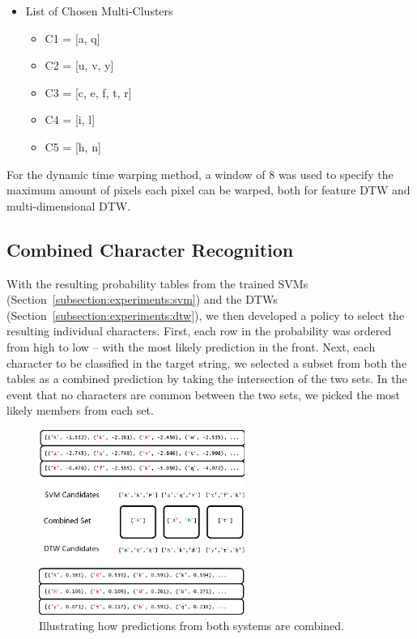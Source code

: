 \documentclass[12pt]{article}
\begin{document}
	\begin{itemize}
		\item List of Chosen Multi-Clusters
		\begin {itemize}
			\item C1 = [a, q]
			\item C2 = [u, v, y]
			\item C3 = [c, e, f, t, r]
			\item C4 = [i, l]
			\item C5 = [h, n]
		\end {itemize}
	\end {itemize}
	
	For the dynamic time warping method, a window of 8 was used to specify the maximum amount of pixels each pixel can be warped, both for feature DTW and multi-dimensional DTW.
	

	\subsection{Combined Character Recognition}
	\label{subsection:experiments:combinedchar}
		
	With the resulting probability tables from the trained SVMs (Section~\ref{subsection:experiments:svm}) and the DTWs (Section~\ref{subsection:experiments:dtw}), we then developed a policy to select the resulting individual characters. First, each row in the probability was ordered from high to low -- with the most likely prediction in the front. Next, each character to be classified in the target string, we selected a subset from both the tables as a combined prediction by taking the intersection of the two sets. In the event that no characters are common between the two sets, we picked the most likely members from each set. 
	
	\begin{figure}[htbp!]
	\centering
	\includegraphics[width=0.6\textwidth]{combined_predictions.eps}
	\caption{Illustrating how predictions from both systems are combined.}
	\label{figure:combining_characters}
	\end{figure}
	
\end{document}
